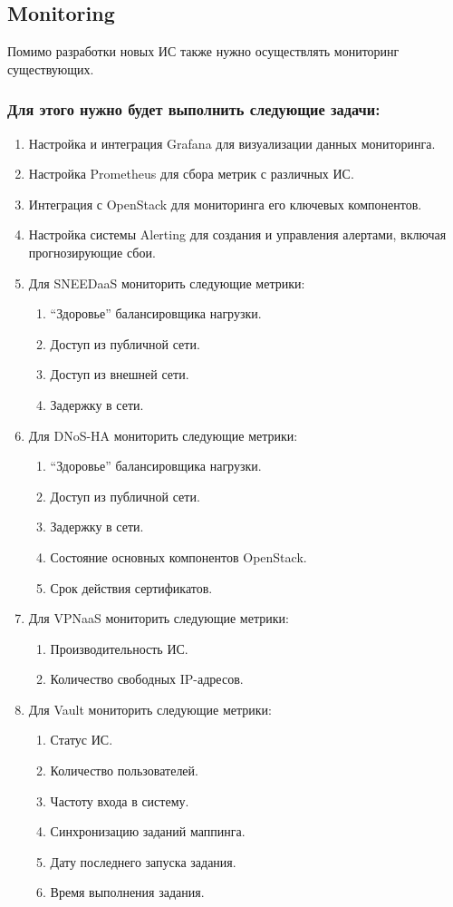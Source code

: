 \documentclass[14pt, a4paper]{extarticle}
\begin{document}
\subsection{Monitoring}

Помимо разработки новых ИС также нужно осуществлять мониторинг существующих.

\subsubsection*{Для этого нужно будет выполнить следующие задачи:}

\begin{enumerate}
\item Настройка и интеграция Grafana для визуализации данных мониторинга.
\item Настройка Prometheus для сбора метрик с различных ИС.
\item Интеграция с OpenStack для мониторинга его ключевых компонентов.
\item Настройка системы Alerting для создания и управления алертами, включая прогнозирующие сбои.
\item Для SNEEDaaS мониторить следующие метрики:
    \begin{enumerate}
    \item “Здоровье” балансировщика нагрузки.
    \item Доступ из публичной сети.
    \item Доступ из внешней сети.
    \item Задержку в сети.
    \end{enumerate}
\item Для DNoS-HA мониторить следующие метрики:
    \begin{enumerate}
    \item “Здоровье” балансировщика нагрузки.
    \item Доступ из публичной сети.
    \item Задержку в сети.
    \item Состояние основных компонентов OpenStack.
    \item Срок действия сертификатов.
    \end{enumerate}
\item Для VPNaaS мониторить следующие метрики:
    \begin{enumerate}
    \item Производительность ИС.
    \item Количество свободных IP-адресов.
    \end{enumerate}
\item Для Vault мониторить следующие метрики:
    \begin{enumerate}
    \item Статус ИС.
    \item Количество пользователей.
    \item Частоту входа в систему.
    \item Синхронизацию заданий маппинга.
    \item Дату последнего запуска задания.
    \item Время выполнения задания.
    \end{enumerate}
\end{enumerate}
\end{document}

